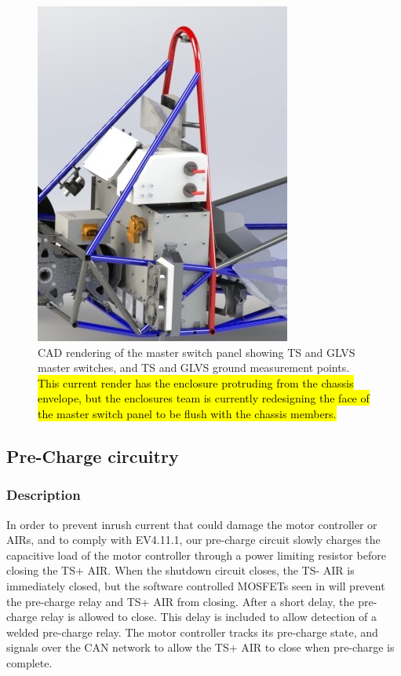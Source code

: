 \documentclass{article}
\begin{document}
\begin{figure}[H]
\centering
\includegraphics[scale=1]{MSP_Box_Angle}
\caption{CAD rendering of the master switch panel showing TS and GLVS master switches, and TS and GLVS ground measurement points. \hl{This current render has the enclosure protruding from the chassis envelope, but the enclosures team is currently redesigning the face of the master switch panel to be flush with the chassis members.}}
\label{fig:master_switch_panel}
\end{figure}

 
\subsection{Pre-Charge circuitry}\label{pre_charge_circuitry}
\subsubsection{Description}

In order to prevent inrush current that could damage the motor controller or AIRs, and to comply with EV4.11.1, our pre-charge circuit slowly charges the capacitive load of the motor controller through a power limiting resistor before closing the TS+ AIR. When the shutdown circuit closes, the TS- AIR is immediately closed, but the software controlled MOSFETs seen in  will prevent the pre-charge relay and TS+ AIR from closing. After a short delay, the pre-charge relay is allowed to close. This delay is included to allow detection of a welded pre-charge relay. The motor controller tracks its pre-charge state, and signals over the CAN network to allow the TS+ AIR to close when pre-charge is complete. 
\end{document}
